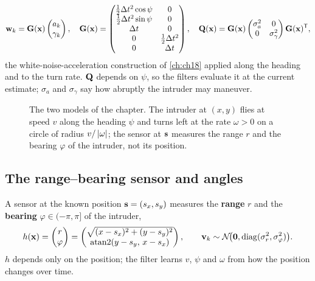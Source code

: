 \begin{equation}
  \mathbf{w}_k = \mathbf{G}(\mathbf{x})\begin{pmatrix} a_k\\ \gamma_k\end{pmatrix},
  \quad
  \mathbf{G}(\mathbf{x}) =
  \begin{pmatrix}
    \tfrac12\Delta t^2\cos\psi & 0\\
    \tfrac12\Delta t^2\sin\psi & 0\\
    \Delta t & 0\\
    0 & \tfrac12\Delta t^2\\
    0 & \Delta t
  \end{pmatrix},
  \quad
  \mathbf{Q}(\mathbf{x}) = \mathbf{G}(\mathbf{x})
  \begin{pmatrix}\sigma_a^2 & 0\\ 0 & \sigma_\gamma^2\end{pmatrix}
  \mathbf{G}(\mathbf{x})^{\mathsf{T}},
  \label{eq:ch19-ct-noise}
\end{equation}
the white-noise-acceleration construction of \cref{ch:ch18} applied along
the heading and to the turn rate. $\mathbf{Q}$ depends on $\psi$, so the filters
evaluate it at the current estimate; $\sigma_a$ and $\sigma_\gamma$ say how
abruptly the intruder may maneuver.

\begin{figure}[tb]
  \centering
  \caption{The two models of the chapter. The intruder at $(x, y)$ flies at
  speed $v$ along the heading $\psi$ and turns left at the rate $\omega > 0$
  on a circle of radius $v/\left\lvert \omega \right\rvert$; the sensor at $\mathbf{s}$ measures
  the range $r$ and the bearing $\varphi$ of the intruder, not its position.}
  \label{fig:ch19-models}
\end{figure}

\subsection{The range--bearing sensor and angles}
\label{sec:ch19-rb}

\begin{definition}
\label{def:ch19-rb}
A sensor at the known position $\mathbf{s} = (s_x, s_y)$ measures the
\textbf{range} $r$ and the \textbf{bearing}
$\varphi \in (-\pi, \pi]$ of the intruder,
\begin{equation}
  h(\mathbf{x}) =
  \begin{pmatrix} r \\ \varphi \end{pmatrix} =
  \begin{pmatrix}
    \sqrt{(x - s_x)^2 + (y - s_y)^2}\\
    \operatorname{atan2}(y - s_y,\, x - s_x)
  \end{pmatrix},
  \qquad
  \mathbf{v}_k \sim \mathcal{N}\!\bigl(\mathbf{0}, \operatorname{diag}(\sigma_r^2, \sigma_\varphi^2)\bigr).
  \label{eq:ch19-rb}
\end{equation}
$h$ depends only on the position; the filter learns $v$, $\psi$ and $\omega$
from how the position changes over time.
\end{definition}

